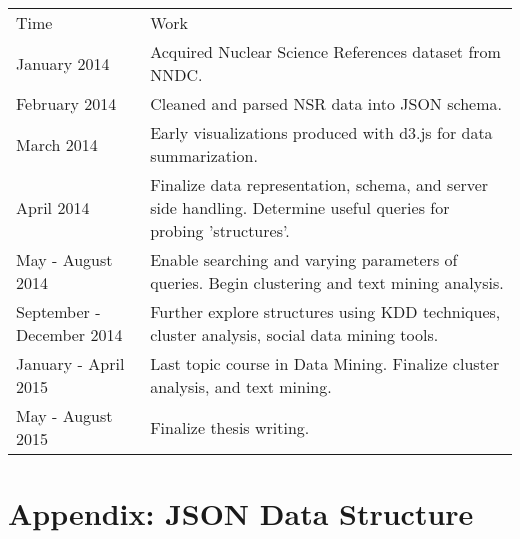 \documentclass[12pt]{article}
\begin{document}
\begin{doublespacing}
\begin{table}[hb]
    \begin{tabular}{|p{6cm}|p{10cm}|}
    Time                      & Work                                                                                                               \\
    January 2014              & Acquired Nuclear Science References dataset from NNDC.                                                             \\
    February 2014             & Cleaned and parsed NSR data into JSON schema.                                                                      \\
    March 2014                & Early visualizations produced with d3.js for data summarization.                                                   \\
    April 2014                & Finalize data representation, schema, and server side handling. Determine useful queries for probing 'structures'. \\
    May - August 2014         & Enable searching and varying parameters of queries. Begin clustering and text mining analysis.                     \\
    September - December 2014 & Further explore structures using KDD techniques, cluster analysis, social data mining tools.                       \\
    January - April 2015      & Last topic course in Data Mining. Finalize cluster analysis, and text mining.                                      \\
    May - August 2015         & Finalize thesis writing.                                                                                           \\
    \end{tabular}
\end{table}

\pagebreak
\section{Appendix: JSON Data Structure}



\end{doublespacing}
\end{document}
